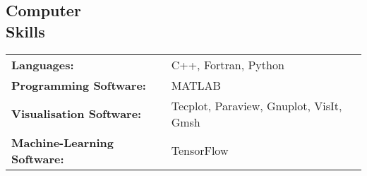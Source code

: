 \documentclass[margin]{res}
\begin{document}
\begin{resume}


\section{Computer \\ Skills}
   \begin{tabular}{l p{3in}}
    {\bf Languages:} & C++, Fortran, Python \\

    {\bf Programming Software:} &  MATLAB \\
    
    {\bf Visualisation Software:} & Tecplot, Paraview, Gnuplot, VisIt, Gmsh \\
    
    {\bf Machine-Learning Software:} & TensorFlow
 \end{tabular}


\end{resume} 
\end{document}
